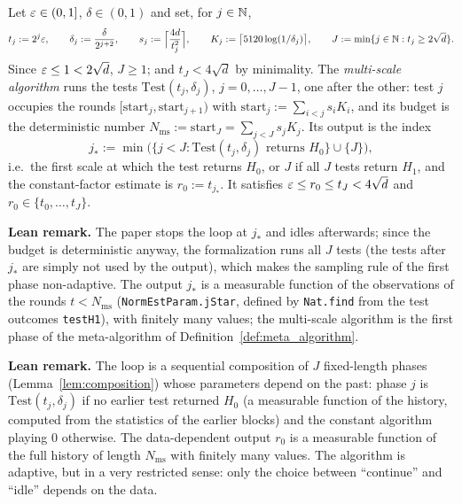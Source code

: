 \begin{definition}\label{def:multiscale_algorithm}
\leanok
{}
Let $\varepsilon \in (0,1]$, $\delta \in (0,1)$ and set, for $j \in \mathbb{N}$,
\[
  t_j := 2^j\varepsilon, \qquad \delta_j := \frac{\delta}{2^{j+2}}, \qquad
  s_j := \Big\lceil \frac{4d}{t_j^2} \Big\rceil, \qquad
  K_j := \big\lceil 5120\log(1/\delta_j) \big\rceil, \qquad
  J := \min\{ j \in \mathbb{N} : t_j \ge 2\sqrt d \} .
\]
Since $\varepsilon \le 1 < 2\sqrt d$, $J \ge 1$; and $t_J < 4\sqrt d$ by minimality. The
\emph{multi-scale algorithm} runs the tests $\mathrm{Test}(t_j, \delta_j)$, $j = 0, \dots, J-1$,
one after the other: test $j$ occupies the rounds $[\mathrm{start}_j, \mathrm{start}_{j+1})$
with $\mathrm{start}_j := \sum_{i<j} s_iK_i$, and its budget is the deterministic number
$N_{\mathrm{ms}} := \mathrm{start}_J = \sum_{j<J} s_jK_j$. Its output is the index
\[
  j_* := \min\big( \{ j < J : \mathrm{Test}(t_j,\delta_j) \text{ returns } H_0 \} \cup \{J\} \big),
\]
i.e.\ the first scale at which the test returns $H_0$, or $J$ if all $J$ tests return $H_1$,
and the constant-factor estimate is $r_0 := t_{j_*}$. It satisfies
$\varepsilon \le r_0 \le t_J < 4\sqrt d$ and $r_0 \in \{t_0, \dots, t_J\}$.
\end{definition}

\textbf{Lean remark.} The paper stops the loop at $j_*$ and idles afterwards; since the
budget is deterministic anyway, the formalization runs all $J$ tests (the tests after $j_*$
are simply not used by the output), which makes the sampling rule of the first phase
non-adaptive. The output $j_*$ is a measurable function of the observations of the rounds
$t < N_{\mathrm{ms}}$ (\texttt{NormEstParam.jStar}, defined by \texttt{Nat.find} from the
test outcomes \texttt{testH1}), with finitely many values; the multi-scale algorithm is the
first phase of the meta-algorithm of Definition~\ref{def:meta_algorithm}.

\textbf{Lean remark.} The loop is a sequential composition of $J$ fixed-length phases
(Lemma~\ref{lem:composition}) whose parameters depend on the past: phase $j$ is
$\mathrm{Test}(t_j,\delta_j)$ if no earlier test returned $H_0$ (a measurable function of the
history, computed from the statistics of the earlier blocks) and the constant algorithm
playing $0$ otherwise. The data-dependent output $r_0$ is a measurable function of the full
history of length $N_{\mathrm{ms}}$ with finitely many values. The algorithm is adaptive, but
in a very restricted sense: only the choice between ``continue'' and ``idle'' depends on the
data.

